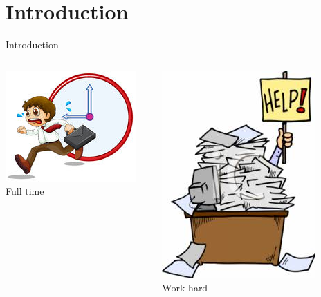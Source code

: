 \section*{Introduction}
\begin{frame}{Introduction}
\vspace*{-0.4cm}
\begin{columns}
    \begin{column}{.4\textwidth}
        \begin{center} \includegraphics[scale=1.65]{figures/time.jpg}\\
        Full time
        \end{center}
    \end{column}
    \hspace*{-1.5cm}
    \begin{column}{.4\textwidth}
        \begin{center} \includegraphics[scale=0.85]{figures/hard.jpg}\\
        Work hard
        \end{center}
    \end{column}
    \hspace*{-1.5cm}
    \begin{column}{.4\textwidth}

\end{column}
\end{columns}
\end{frame}
